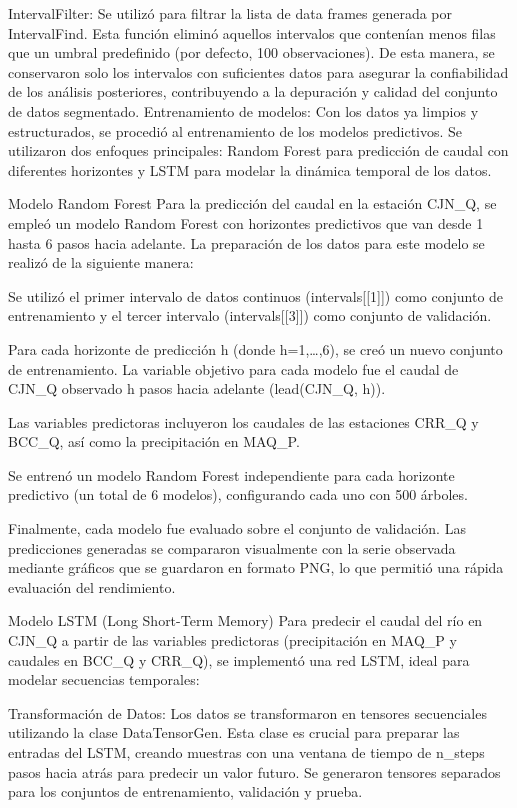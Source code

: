 \documentclass[hess, manuscript]{copernicus}
\begin{document}
IntervalFilter: Se utilizó para filtrar la lista de data frames generada por IntervalFind. Esta función eliminó aquellos intervalos que contenían menos filas que un umbral predefinido (por defecto, 100 observaciones). De esta manera, se conservaron solo los intervalos con suficientes datos para asegurar la confiabilidad de los análisis posteriores, contribuyendo a la depuración y calidad del conjunto de datos segmentado.
Entrenamiento de modelos:
Con los datos ya limpios y estructurados, se procedió al entrenamiento de los modelos predictivos. Se utilizaron dos enfoques principales: Random Forest para predicción de caudal con diferentes horizontes y LSTM para modelar la dinámica temporal de los datos.

Modelo Random Forest
Para la predicción del caudal en la estación CJN_Q, se empleó un modelo Random Forest con horizontes predictivos que van desde 1 hasta 6 pasos hacia adelante. La preparación de los datos para este modelo se realizó de la siguiente manera:

Se utilizó el primer intervalo de datos continuos (intervals[[1]]) como conjunto de entrenamiento y el tercer intervalo (intervals[[3]]) como conjunto de validación.

Para cada horizonte de predicción h (donde h=1,…,6), se creó un nuevo conjunto de entrenamiento. La variable objetivo para cada modelo fue el caudal de CJN_Q observado h pasos hacia adelante (lead(CJN_Q, h)).

Las variables predictoras incluyeron los caudales de las estaciones CRR_Q y BCC_Q, así como la precipitación en MAQ_P.

Se entrenó un modelo Random Forest independiente para cada horizonte predictivo (un total de 6 modelos), configurando cada uno con 500 árboles.

Finalmente, cada modelo fue evaluado sobre el conjunto de validación. Las predicciones generadas se compararon visualmente con la serie observada mediante gráficos que se guardaron en formato PNG, lo que permitió una rápida evaluación del rendimiento.

Modelo LSTM (Long Short-Term Memory)
Para predecir el caudal del río en CJN_Q a partir de las variables predictoras (precipitación en MAQ_P y caudales en BCC_Q y CRR_Q), se implementó una red LSTM, ideal para modelar secuencias temporales:

Transformación de Datos: Los datos se transformaron en tensores secuenciales utilizando la clase DataTensorGen. Esta clase es crucial para preparar las entradas del LSTM, creando muestras con una ventana de tiempo de n_steps pasos hacia atrás para predecir un valor futuro. Se generaron tensores separados para los conjuntos de entrenamiento, validación y prueba.
\end{document}
